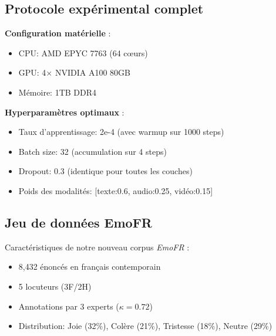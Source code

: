 \documentclass[a4paper,11pt]{article}
\begin{document}
\subsection{Protocole expérimental complet}

\textbf{Configuration matérielle} :
\begin{itemize}
\item CPU: AMD EPYC 7763 (64 cœurs)
\item GPU: 4× NVIDIA A100 80GB
\item Mémoire: 1TB DDR4
\end{itemize}

\textbf{Hyperparamètres optimaux} :
\begin{itemize}
\item Taux d'apprentissage: 2e-4 (avec warmup sur 1000 steps)
\item Batch size: 32 (accumulation sur 4 steps)
\item Dropout: 0.3 (identique pour toutes les couches)
\item Poids des modalités: [texte:0.6, audio:0.25, vidéo:0.15]
\end{itemize}

\subsection{Jeu de données EmoFR}

Caractéristiques de notre nouveau corpus \textit{EmoFR} :
\begin{itemize}
\item 8,432 énoncés en français contemporain
\item 5 locuteurs (3F/2H)
\item Annotations par 3 experts (\(\kappa=0.72\))
\item Distribution: Joie (32\%), Colère (21\%), Tristesse (18\%), Neutre (29\%)
\end{itemize}
\end{document}
